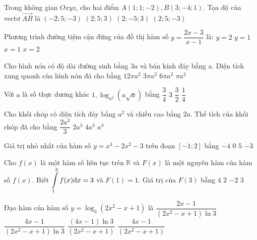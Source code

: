 \begin{ex}%
Trong không gian $O x y z$, cho hai điểm $A(1; 1;-2), B(3;-4; 1)$. Tọa độ của vectơ $\overrightarrow{AB}$ là
\choice
{$(-2; 5;-3)$}
{$(2; 5; 3)$}
{\True $(2;-5; 3)$}
{$(2; 5;-3)$}

\end{ex}
\begin{ex}%
Phương trình đường tiệm cận đứng của đồ thị hàm số $y=\dfrac{2 x-3}{x-1}$ là:
\choice
{$y=2$}
{$y=1$}
{\True $x=1$}
{$x=2$}

\end{ex}
\begin{ex}%
Cho hình nón có độ dài đường sinh bằng $3 a$ và bán kính đáy bằng a. Diện tích xung quanh của hình nón đã cho bằng
\choice
{$12\pi a^2$}
{\True $3\pi a^2$}
{$6\pi a^2$}
{$\pi a^2$}

\end{ex}
\begin{ex}%
Với $a$ là số thực dương khác $1, \log_{a^2}(a \sqrt{a})$ bằng
\choice
{$\dfrac{3}{4}$}
{$3$}
{\True $\dfrac{3}{2}$}
{$\dfrac{1}{4}$}

\end{ex}
\begin{ex}%
Cho khối chóp có diện tích đáy bằng $a^2$ và chiều cao bằng $2 a$. Thể tích của khối chóp đã cho bằng
\choice
{\True $\dfrac{2 a^3}{3}$}
{$2 a^3$}
{$4 a^3$}
{$a^3$}

\end{ex}
\begin{ex}%
Giá trị nhỏ nhất của hàm số $y=x^4-2 x^2-3$ trên đoạn $[-1; 2]$ bằng
\choice
{\True $-4$}
{$0$}
{$5$}
{$-3$}

\end{ex}
\begin{ex}%
Cho $f(x)$ là một hàm số liên tục trên $\mathbb{R}$ và $F(x)$ là một nguyên hàm của hàm số $f(x)$. Biết $\displaystyle\displaystyle\int\limits_1^3 f(x) \mathrm{d} x=3$ và $F(1)=1$. Giá trị của $F(3)$ bẵng
\choice
{\True $4$}
{$2$}
{$-2$}
{$3$}

\end{ex}
\begin{ex}%
Đạo hàm của hàm số $y=\log_3\left(2 x^2-x+1\right)$ là
\choice
{$\dfrac{2 x-1}{\left(2 x^2-x+1\right) \ln 3}$}
{\True $\dfrac{4 x-1}{\left(2 x^2-x+1\right) \ln 3}$}
{$\dfrac{(4 x-1) \ln 3}{\left(2 x^2-x+1\right)}$}
{$\dfrac{4 x-1}{\left(2 x^2-x+1\right)}$}

\end{ex}

